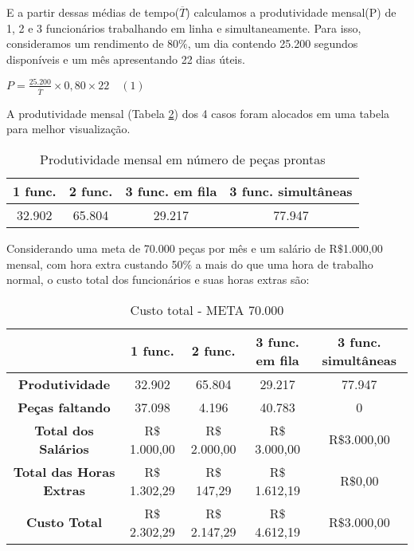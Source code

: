 \documentclass[
	12pt,				%
	oneside,			%
	a4paper,			%
	english,			%
	french,				%
	spanish,			%
	brazil,				%
	]{abntex2}
\begin{document}
E a partir dessas médias de tempo($\overline{T}$) calculamos a produtividade mensal(P) de 1, 2 e 3 funcionários trabalhando em linha e simultaneamente. Para isso, consideramos um rendimento de 80$\%$, um dia contendo 25.200 segundos disponíveis e um mês apresentando 22 dias úteis.

\begin{center}

$P = \frac{25.200}{\overline{T}} \times 0,80 \times 22 \quad (1)$

\end{center}


A produtividade mensal (Tabela \ref{t3}) dos 4 casos foram alocados em uma tabela para melhor visualização.

\begin{table}[H]
\centering
\caption{Produtividade mensal em número de peças prontas}
\vspace{0.5cm}
\begin{tabular}{c|c|c|c}

\textbf{1 func.} & \textbf{2 func.} & \textbf{3 func. em fila} & \textbf{3 func. simultâneas} \\
\hline

32.902 & 65.804 & 29.217 & 77.947

\end{tabular}
\label{t3}
\end{table}

Considerando uma meta de 70.000 peças por mês e um salário de R$\$$1.000,00 mensal, com hora extra custando 50$\%$ a mais do que uma hora de trabalho normal, o custo total dos funcionários e suas horas extras são:

\begin{table}[H]
\centering
\caption{Custo total - META 70.000}
\vspace{0.5cm}
\begin{tabular}{c|c|c|c|c}

			 & \textbf{1 func.} & \textbf{2 func.} & \textbf{3 func. em fila} & \textbf{3 func. simultâneas} \\ \hline
\textbf{Produtividade} & 32.902 & 65.804 & 29.217 & 77.947 \\ \hline
\textbf{Peças faltando} & 37.098 & 4.196 & 40.783 & 0 \\ \hline
\textbf{Total dos Salários} & R$\$$1.000,00 & R$\$$2.000,00 & R$\$$3.000,00 & R$\$$3.000,00 \\ \hline
\textbf{Total das Horas Extras} & R$\$$1.302,29 & R$\$$147,29 & R$\$$1.612,19 & R$\$$0,00 \\ \hline
\textbf{Custo Total} & R$\$$2.302,29 & R$\$$2.147,29 & R$\$$4.612,19 & R$\$$3.000,00 

\end{tabular}
\label{t3}
\end{table}
\end{document}
